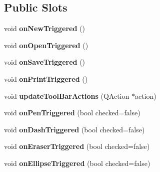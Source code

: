 \subsection*{Public Slots}
\begin{DoxyCompactItemize}
\item 
\hypertarget{classMainWindow_a28666fb7f851bfe88e9dadaf16d87265}{}void {\bfseries on\+New\+Triggered} ()\label{classMainWindow_a28666fb7f851bfe88e9dadaf16d87265}

\item 
\hypertarget{classMainWindow_a67bf5a5927ec05c9248fb48845e3f577}{}void {\bfseries on\+Open\+Triggered} ()\label{classMainWindow_a67bf5a5927ec05c9248fb48845e3f577}

\item 
\hypertarget{classMainWindow_a3c0d506d7c7ab0bc4cb7013cd17c78d3}{}void {\bfseries on\+Save\+Triggered} ()\label{classMainWindow_a3c0d506d7c7ab0bc4cb7013cd17c78d3}

\item 
\hypertarget{classMainWindow_a292b92dc69ea1330ff3063b46fbd16ca}{}void {\bfseries on\+Print\+Triggered} ()\label{classMainWindow_a292b92dc69ea1330ff3063b46fbd16ca}

\item 
\hypertarget{classMainWindow_a3f5ea17169dbe80359444d1d0bbaae6a}{}void {\bfseries update\+Tool\+Bar\+Actions} (Q\+Action $\ast$action)\label{classMainWindow_a3f5ea17169dbe80359444d1d0bbaae6a}

\item 
\hypertarget{classMainWindow_ad8da011224afa03535539924443c2138}{}void {\bfseries on\+Pen\+Triggered} (bool checked=false)\label{classMainWindow_ad8da011224afa03535539924443c2138}

\item 
\hypertarget{classMainWindow_ae0040451a07ca3d93ca606d040a5d38a}{}void {\bfseries on\+Dash\+Triggered} (bool checked=false)\label{classMainWindow_ae0040451a07ca3d93ca606d040a5d38a}

\item 
\hypertarget{classMainWindow_a27a78f6e2caac6f3a5edb3e705a7fb1b}{}void {\bfseries on\+Eraser\+Triggered} (bool checked=false)\label{classMainWindow_a27a78f6e2caac6f3a5edb3e705a7fb1b}

\item 
\hypertarget{classMainWindow_a33728b81b2bf13a6d0eb92b34816dfd8}{}void {\bfseries on\+Ellipse\+Triggered} (bool checked=false)\label{classMainWindow_a33728b81b2bf13a6d0eb92b34816dfd8}


\end{DoxyCompactItemize}
